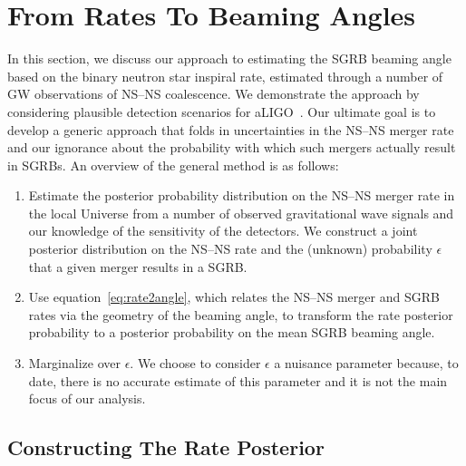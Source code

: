 \documentclass[twocolumn,nofootinbib]{revtex4-1}
\newcommand{\BNS}{\ac{NS}--\ac{NS}\xspace}
\begin{document}
\section{From Rates To Beaming Angles}

In this section, we discuss our approach to estimating the \ac{SGRB} beaming angle based on the binary neutron star inspiral rate, estimated through a number of \ac{GW} observations of \BNS coalescence.
We demonstrate the approach by considering plausible detection scenarios for \ac{aLIGO}~\cite{Aasi:2013wya}.
Our ultimate goal is to develop a generic approach that folds in uncertainties in the \BNS merger rate and our ignorance about the probability with which such mergers actually result in \acp{SGRB}.
%
An overview of the general method is as follows:

\begin{enumerate}
    \item Estimate the posterior probability distribution on the \BNS merger rate
    in the local Universe from a number of observed gravitational wave signals
    and our knowledge of the sensitivity of the detectors.  We construct a joint
    posterior distribution on the \BNS rate and the (unknown) probability
    $\epsilon$ that a given merger results in a \ac{SGRB}.
\item Use equation~\ref{eq:rate2angle}, which relates the \BNS merger and
    \ac{SGRB} rates via the geometry of the beaming angle, to transform the rate
    posterior probability to a posterior probability on the mean \ac{SGRB}
    beaming angle.
\item Marginalize over $\epsilon$. We choose to consider $\epsilon$ a nuisance
    parameter because, to date, there is no accurate estimate of this parameter
    and it is not the main focus of our analysis. 
\end{enumerate}


\subsection{Constructing The Rate Posterior}
\label{sec:rate_posterior}
%
\end{document}
